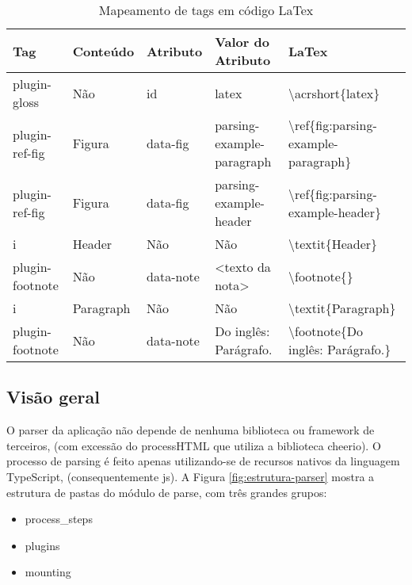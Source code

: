 \begin{table}[H]
    \centering
    \caption{Mapeamento de tags em código LaTex}
    \label{tbl:plugins-latex-mapping}
    \renewcommand{\arraystretch}{1.5}
    \begin{tabular}{p{1.9200cm} p{1.9200cm} p{1.9200cm} p{3.2000cm} p{7.0400cm}}
        \hline
        \textbf{Tag} & \textbf{Conteúdo} & \textbf{Atributo} & \textbf{Valor do Atributo} & \textbf{LaTex} \\
        \hline
        plugin-gloss & Não & id & latex & \textbackslash acrshort\{latex\} \\
		plugin-ref-fig & Figura & data-fig & parsing-example-paragraph & \textbackslash ref\{fig:parsing-example-paragraph\} \\
		plugin-ref-fig & Figura & data-fig & parsing-example-header & \textbackslash ref\{fig:parsing-example-header\} \\
		i & Header & Não & Não & \textbackslash textit\{Header\} \\
		plugin-footnote & Não & data-note & <texto da nota> & \textbackslash footnote\{<texto da nota>\} \\
		i & Paragraph & Não & Não & \textbackslash textit\{Paragraph\} \\
		plugin-footnote & Não & data-note & Do inglês: Parágrafo. & \textbackslash footnote\{Do inglês: Parágrafo.\} \\
        \hline
        
    \end{tabular}
\end{table}

\subsection{Visão geral}

O parser da aplicação não depende de nenhuma biblioteca
ou framework de terceiros,
(com excessão do processHTML que utiliza a biblioteca cheerio).
O processo de parsing é feito
apenas utilizando-se de recursos nativos da linguagem
TypeScript, (consequentemente
\acrshort{js}).
A
Figura \ref{fig:estrutura-parser}
mostra a estrutura de pastas do módulo de parse, com três grandes
grupos:

\begin{itemize}
        
	\item process\_steps
	\item plugins
	\item mounting
    
\end{itemize}

